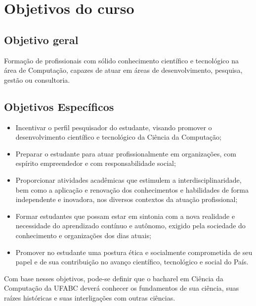 \section{Objetivos do curso}

\subsection{Objetivo geral}

Formação de profissionais com sólido conhecimento científico e tecnológico na
área de Computação, capazes de atuar em áreas de desenvolvimento, pesquisa,
gestão ou consultoria.

\subsection{Objetivos Específicos}

\begin{itemize}
    \item Incentivar o perfil pesquisador do estudante, visando promover o
    desenvolvimento científico e tecnológico da Ciência da Computação;

    \item Preparar o estudante para atuar profissionalmente em organizações,
    com espírito empreendedor e com responsabilidade social;

    \item Proporcionar atividades acadêmicas que estimulem a
    interdisciplinaridade, bem como a aplicação e renovação dos conhecimentos e
    habilidades de forma independente e inovadora, nos diversos contextos da
    atuação profissional;

    \item Formar estudantes que possam estar em sintonia com a nova realidade e
    necessidade do aprendizado contínuo e autônomo, exigido pela sociedade do
    conhecimento e organizações dos dias atuais;

    \item Promover no estudante uma postura ética e socialmente comprometida de
    seu papel e de sua contribuição no avanço científico, tecnológico e social
    do País.
\end{itemize}

Com base nesses objetivos, pode-se definir que o bacharel em Ciência da
Computação da UFABC deverá conhecer os fundamentos de sua ciência, suas raízes
históricas e suas interligações com outras ciências.

